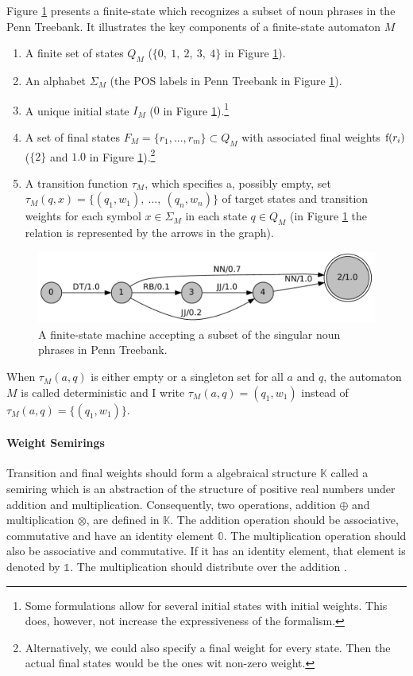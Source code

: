Figure \ref{fig:np-fsm} presents a finite-state which recognizes a
subset of noun phrases in the Penn Treebank. It illustrates the key
components of a finite-state automaton $M$
\begin{enumerate}
\item A finite set of states $Q_M$ ($\{0,\ 1,\ 2,\ 3,\ 4\}$ in Figure \ref{fig:np-fsm}).
\item An alphabet $\Sigma_M$ (the POS labels in Penn Treebank in Figure \ref{fig:np-fsm}).
\item A unique initial state $I_M$ ($0$ in Figure \ref{fig:np-fsm}).\footnote{Some formulations allow for several initial states with initial weights. This does, however, not increase the expressiveness of the formalism.}
\item A set of final states $F_M = \{r_1, ..., r_m\} \subset Q_M$ with associated final weights ${\rm f}(r_i)$ ($\{2\}$ and $1.0$ in Figure \ref{fig:np-fsm}).\footnote{Alternatively, we could also specify a final weight for every state. Then the actual final states would be the ones wit non-zero weight.}
\item A transition function $\tau_M$, which specifies a, possibly empty, set $\tau_M(q,x) = \{(q_1,w_1),\ ...,\ (q_n,w_n)\}$ of target states and transition weights for each symbol $x\in \Sigma_M$ in each state $q \in Q_M$ (in Figure \ref{fig:np-fsm} the relation is represented by the arrows in the graph).
\end{enumerate}
\begin{figure}[!ftb]
\begin{center}
\includegraphics[scale=.7]{np}
\end{center}
\caption{A finite-state machine accepting a subset of the singular noun phrases in Penn Treebank.}\label{fig:np-fsm}
\end{figure}
When $\tau_M(a,q)$ is either empty or a singleton set for all $a$ and $q$, the automaton $M$ is called deterministic and I write $\tau_M(a,q) = (q_1,w_1)$ instead of $\tau_M(a,q) = \{(q_1,w_1)\}$.

\paragraph{Weight Semirings} Transition and final weights should form a
algebraical structure $\mathbb{K}$ called a semiring which is an abstraction of the
structure of positive real numbers under addition and multiplication. Consequently, two operations, addition $\oplus$ and
multiplication $\otimes$, are defined in $\mathbb{K}$. The addition operation should be
associative, commutative and have an identity element
$\mathbb{0}$. The multiplication operation should also be associative
and commutative. If it has an identity element, that element is
denoted by $\mathbb{1}$. The multiplication should distribute over the
addition \citep{Allauzen2007}.

